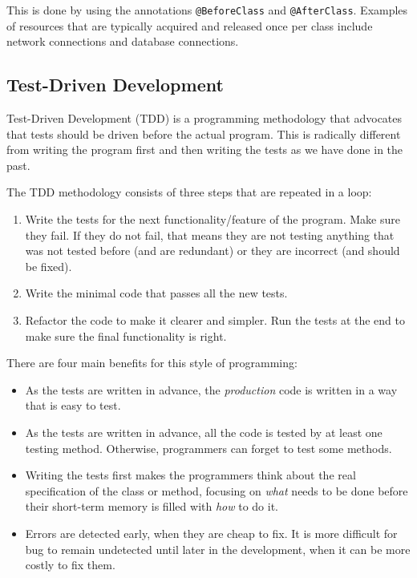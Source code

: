 This is done by using the annotations \verb+@BeforeClass+ and
\verb+@AfterClass+. Examples of resources that are typically acquired and
released once per class include network connections and database
connections. 


\subsection{Test-Driven Development}
\label{sec:test-driv-devel}

Test-Driven Development (TDD) is a programming methodology that advocates
that tests should be driven before the actual program. This is
radically different from writing the program first and then writing
the tests as we have done in the past.

The TDD methodology consists of three steps that are repeated in a
loop: 

\begin{enumerate}
\item Write the tests for the next functionality/feature of the program. Make
  sure they fail. If they do not fail, that means they are not testing
  anything that was not tested before (and are redundant) or they are
  incorrect (and should be fixed). 
\item Write the minimal code that passes all the new tests.
\item Refactor the code to make it clearer and simpler. Run the tests
  at the end to make sure the final functionality is right. 
\end{enumerate}

There are four main benefits for this style of programming:

\begin{itemize}
\item As the tests are written in advance, the \emph{production} code
  is written in a way that is easy to test.
\item As the tests are written in advance, all the code is tested by
  at least one testing method. Otherwise, programmers can forget to
  test some methods.
\item Writing the tests first makes the programmers think about the
  real specification of the class or method, focusing on \emph{what}
  needs to be done before their short-term memory is filled with
  \emph{how} to do it.
\item Errors are detected early, when they are cheap to fix. It is
  more difficult for bug to remain undetected until later in the
  development, when it can be more costly to fix them.
\end{itemize}

